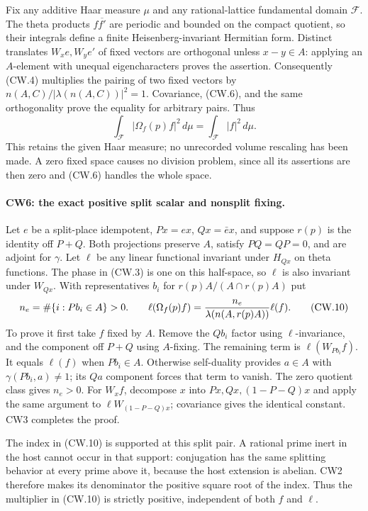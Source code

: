 Fix any additive Haar measure $\mu$ and any rational-lattice
fundamental domain $\mathcal F$.  The theta products
$f\overline{f'}$ are periodic and bounded on the compact quotient,
so their integrals define a finite Heisenberg-invariant Hermitian
form.  Distinct translates $W_xe,W_ye'$ of fixed vectors are
orthogonal unless $x-y\in A$: applying an $A$-element with unequal
eigencharacters proves the assertion.  Consequently (CW.4) multiplies
the pairing of two fixed vectors by
$n(A,C)/|\lambda(n(A,C))|^2=1$.  Covariance, (CW.6), and the same
orthogonality prove the equality for arbitrary pairs.  Thus
\[
 \int_{\mathcal F}|\Omega_f(p)f|^2\,d\mu
                     =\int_{\mathcal F}|f|^2\,d\mu .   \tag{CW.9}
\]
This retains the given Haar measure; no unrecorded volume rescaling
has been made.  A zero fixed space causes no division problem, since
all its assertions are then zero and (CW.6) handles the whole space.

\paragraph{CW6: the exact positive split scalar and nonsplit fixing.}
Let $e$ be a split-place idempotent, $P x=ex$, $Qx=\bar e x$, and
suppose $r(p)$ is the identity off $P+Q$.  Both projections preserve
$A$, satisfy $PQ=QP=0$, and are adjoint for $\gamma$.
Let $\ell$ be any linear functional invariant under $H_{Qx}$ on
theta functions.  The phase in (CW.3) is one on this half-space,
so $\ell$ is also invariant under $W_{Qx}$.  With representatives
$b_i$ for $r(p)A/(A\cap r(p)A)$ put
\[
 n_e=\#\{i:Pb_i\in A\}>0.
 \qquad
 \ell(\Omega_f(p)f)
       ={n_e\over\lambda(n(A,r(p)A))}\ell(f).          \tag{CW.10}
\]
To prove it first take $f$ fixed by $A$.  Remove the $Qb_i$ factor
using $\ell$-invariance, and the component off $P+Q$ using
$A$-fixing.  The remaining term is $\ell(W_{Pb_i}f)$.
It equals $\ell(f)$ when $Pb_i\in A$.  Otherwise self-duality
provides $a\in A$ with $\gamma(Pb_i,a)\ne1$; its $Qa$ component
forces that term to vanish.  The zero quotient class gives $n_e>0$.
For $W_xf$, decompose $x$ into $Px,Qx,(1-P-Q)x$ and apply the
same argument to $\ell W_{(1-P-Q)x}$; covariance gives the identical
constant.  CW3 completes the proof.

The index in (CW.10) is supported at this split pair.  A rational
prime inert in the host cannot occur in that support: conjugation
has the same splitting behavior at every prime above it, because
the host extension is abelian.  CW2 therefore makes its denominator
the positive square root of the index.  Thus the multiplier in
(CW.10) is strictly positive, independent of both $f$ and $\ell$.

